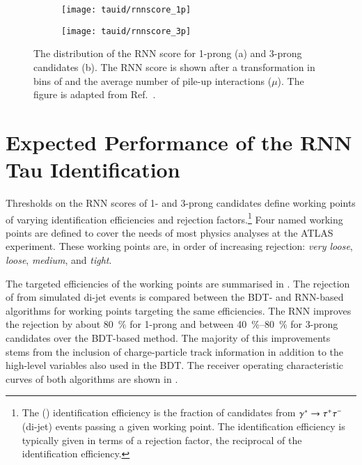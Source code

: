 \begin{figure}[htbp]
  \centering

  \begin{subfigure}{0.498\textwidth}
    \texttt{[image: tauid/rnnscore\_1p]}
    \subcaption{}
  \end{subfigure}\hfill%
  \begin{subfigure}{0.498\textwidth}
    \texttt{[image: tauid/rnnscore\_3p]}
    \subcaption{}
  \end{subfigure}

  \caption{The distribution of the RNN score for 1-prong (a) and
    3-prong \tauhadvis candidates (b). The RNN score is shown after a
    transformation in bins of \tauhadvis \pT and the average number of
    pile-up interactions ($\mu$). The figure is adapted from
    Ref.~\cite{ATL-PHYS-PUB-2019-033}.}%
  \label{fig:flattened_rnnscore}
\end{figure}


\section{Expected Performance of the RNN Tau Identification}%
\label{sec:tauid_perf}

Thresholds on the RNN scores of 1- and 3-prong \tauhadvis candidates
define working points of varying \tauhadvis identification
efficiencies and \faketauhadvis rejection factors.\footnote{The
  \truetauhadvis (\faketauhadvis) identification efficiency is the
  fraction of \tauhadvis candidates from $\gamma^{*} \to \tau^{+} \tau^{-}$
  (di-jet) events passing a given working point. The \faketauhadvis
  identification efficiency is typically given in terms of a rejection
  factor, the reciprocal of the identification efficiency.} Four named
working points are defined to cover the needs of most physics analyses
at the ATLAS experiment. These working points are, in order of
increasing \faketauhadvis rejection: \emph{very loose}, \emph{loose},
\emph{medium}, and \emph{tight}.

The targeted \truetauhadvis efficiencies of the working points are
summarised in . The rejection of \faketauhadvis from
simulated di-jet events is compared between the BDT- and RNN-based
\tauid algorithms for working points targeting the same \truetauhadvis
efficiencies. The RNN \tauid improves the \faketauhadvis rejection by
about \SI{80}{\percent} for 1-prong and between
\SIrange{40}{80}{\percent} for 3-prong \tauhadvis candidates over the
BDT-based method. The majority of this improvements stems from the
inclusion of charge-particle track information in addition to the
high-level variables also used in the BDT. The receiver operating
characteristic curves of both algorithms are shown in
.

